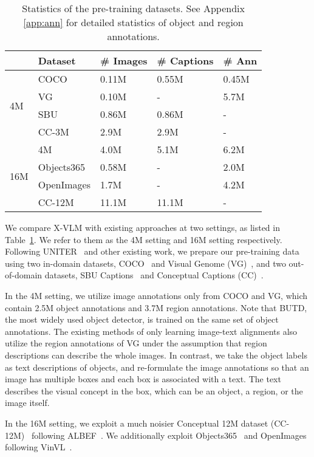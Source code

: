 \documentclass[nohyperref]{article}
\theoremstyle{plain}
\theoremstyle{definition}
\theoremstyle{remark}
\begin{document}
\begin{table}[ht]
	\caption
	{
		Statistics of the pre-training datasets. See Appendix \ref{app:ann} for detailed statistics of object and region annotations. 
	}
	\label{tbl:data}
\small
	\centering	
\begin{tabular}	{l | l | l |  l | l }
	\toprule
	 & Dataset & \# Images  & \# Captions & \# Ann \\
\midrule
	 \multirow{4}{*}{4M} & COCO & 0.11M & 0.55M & 0.45M \\
	 	 & VG & 0.10M & - & 5.7M \\
	 & SBU & 0.86M & 0.86M & -\\
	 & CC-3M & 2.9M & 2.9M & - \\
	 \midrule
	 \multirow{4}{*}{16M} & 4M & 4.0M & 5.1M & 6.2M \\
	 & Objects365 & 0.58M  & - & 2.0M \\ 
	 & OpenImages & 1.7M  & - & 4.2M \\
	 & CC-12M & 11.1M & 11.1M & - \\
	 \bottomrule
	\end{tabular}
\end{table}

We compare X-VLM with existing approaches at two settings, as listed in Table~\ref{tbl:data}. We refer to them as the 4M setting and 16M setting respectively. Following UNITER~\cite{chen2020uniter} and other existing work, we prepare our pre-training data using two in-domain datasets, COCO~\cite{lin2014microsoft} and Visual Genome (VG)~\cite{krishna2016visual}, and two out-of-domain datasets, SBU Captions~\cite{ordonez2011im2text} and Conceptual Captions (CC)~\cite{sharma2018conceptual}. 


In the 4M setting, we utilize image annotations only from COCO and VG, which contain 2.5M object annotations and 3.7M region annotations. Note that BUTD, the most widely used object detector, is trained on the same set of object annotations. The existing methods of only learning image-text alignments also utilize the region annotations of VG under the assumption that region descriptions can describe the whole images. In contrast, we take the object labels as text descriptions of objects, and re-formulate the image annotations so that an image has multiple boxes and each box is associated with a text. The text describes the visual concept in the box, which can be an object, a region, or the image itself. 


In the 16M setting, we exploit a much noisier Conceptual 12M dataset (CC-12M)~\cite{changpinyo2021conceptual} following ALBEF~\cite{li2021align}. We additionally exploit Objects365~\cite{shao2019objects365} and OpenImages~\cite{kuznetsova2018open} following VinVL~\cite{zhang2021vinvl}. 
\end{document}
